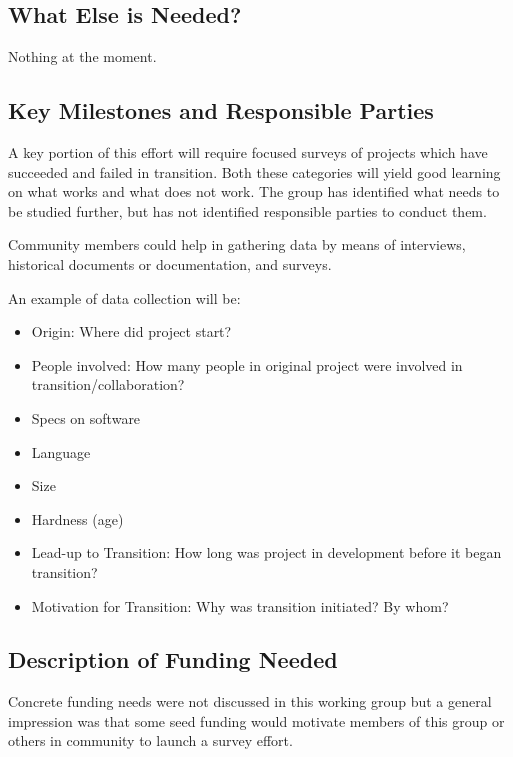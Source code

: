 \subsection{What Else is Needed?}
Nothing at the moment. 

\subsection{Key Milestones and Responsible Parties}

A key portion of this effort will require focused surveys of projects which have
succeeded and failed in transition. Both these categories will yield good
learning on what works and what does not work. The group has identified what
needs to be studied further, but has not identified responsible parties to
conduct them.

Community members could help in gathering data by means of interviews, historical
documents or documentation, and surveys.

An example of data collection will be: 
\begin{itemize}
\item Origin: Where did project start? 
\item People involved: How many people in original project were involved in
transition/collaboration?
\item Specs on software
\item Language
\item Size
\item Hardness (age)
\item Lead-up to Transition: How long was project in development before it began transition?
\item Motivation for Transition: Why was transition initiated? By whom? 
\end{itemize}

\subsection{Description of Funding Needed}

Concrete funding needs were not discussed in this working group but a general
impression was that some seed funding would motivate members of this group or
others in community to launch a survey effort.
